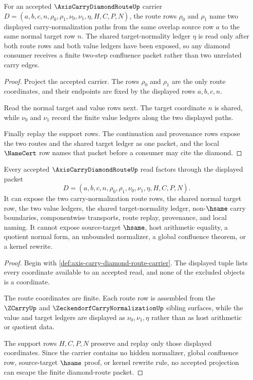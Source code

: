 \begin{theorem}
\label{thm:axis-carry-diamond-route-names-two-step-confluence}
For an accepted $\AxisCarryDiamondRouteUp$ carrier $D=(a,b,c,n,\rho_0,\rho_1,\nu_0,\nu_1,\eta,H,C,P,N)$, the route rows $\rho_0$ and $\rho_1$ name two displayed carry-normalization paths from the same overlap source row $a$ to the same normal target row $n$. The shared target-normality ledger $\eta$ is read only after both route rows and both value ledgers have been exposed, so any diamond consumer receives a finite two-step confluence packet rather than two unrelated carry edges.
\end{theorem}
\begin{proof}
Project the accepted carrier. The rows $\rho_0$ and $\rho_1$ are the only route coordinates, and their endpoints are fixed by the displayed rows $a,b,c,n$.

Read the normal target and value rows next. The target coordinate $n$ is shared, while $\nu_0$ and $\nu_1$ record the finite value ledgers along the two displayed paths.

Finally replay the support rows. The continuation and provenance rows expose the two routes and the shared target ledger as one packet, and the local $\NameCert$ row names that packet before a consumer may cite the diamond.
\end{proof}

\begin{theorem}
\label{thm:axis-carry-diamond-route-nonescape}
Every accepted $\AxisCarryDiamondRouteUp$ read factors through the displayed packet
$$
D=(a,b,c,n,\rho_0,\rho_1,\nu_0,\nu_1,\eta,H,C,P,N).
$$
It can expose the two carry-normalization route rows, the shared normal target row, the two value ledgers, the shared target-normality ledger, non-$\hsame$ carry boundaries, componentwise transports, route replay, provenance, and local naming. It cannot expose source-target $\hsame$, host arithmetic equality, a quotient normal form, an unbounded normalizer, a global confluence theorem, or a kernel rewrite.
\end{theorem}
\begin{proof}
Begin with \autoref{def:axis-carry-diamond-route-carrier}. The displayed tuple lists every coordinate available to an accepted read, and none of the excluded objects is a coordinate.

The route coordinates are finite. Each route row is assembled from the $\ZCarryUp$ and $\ZeckendorfCarryNormalizationUp$ sibling surfaces, while the value and target ledgers are displayed as $\nu_0,\nu_1,\eta$ rather than as host arithmetic or quotient data.

The support rows $H,C,P,N$ preserve and replay only those displayed coordinates. Since the carrier contains no hidden normalizer, global confluence row, source-target $\hsame$ proof, or kernel rewrite rule, no accepted projection can escape the finite diamond-route packet.
\end{proof}

